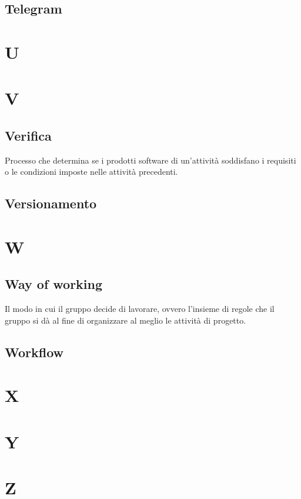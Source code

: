     \subsection{Telegram}
\section{U}
\section{V}
    \subsection{Verifica}
    Processo che determina se i prodotti software di un'attività soddisfano
    i requisiti o le condizioni imposte nelle attività precedenti.
    \subsection{Versionamento}

\section{W}
    \subsection{Way of working}
    Il modo in cui il gruppo decide di lavorare, ovvero l'insieme di regole 
    che il gruppo si dà al fine di organizzare al meglio le attività di progetto.
    \subsection{Workflow}
\section{X}
\section{Y}
\section{Z}
